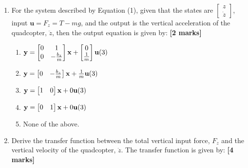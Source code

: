 \documentclass{article}
\begin{document}
\begin{enumerate}
    \vspace{0.5cm}

    \item For the system described by Equation (1), given that the states are $\begin{bmatrix} z \\ \dot{z} \end{bmatrix}$, input $\mathbf{u} = F_z = T - mg$, and the output is the vertical acceleration of the quadcopter, $\ddot{z}$, then the output equation is given by: \hfill \textbf{[2 marks]}
    
    \begin{enumerate}[label=\alph*.]
        \item $\mathbf{y} = \begin{bmatrix} 0 & 1 \\ 0 & -\frac{b_z}{m} \end{bmatrix} \mathbf{x} + \begin{bmatrix} 0 \\ \frac{1}{m} \end{bmatrix} \mathbf{u} \hfill (3)$
        \vspace{2mm}

        \item $\mathbf{y} = \begin{bmatrix} 0 & -\frac{b_z}{m} \end{bmatrix} \mathbf{x} + \frac{1}{m} \mathbf{u} \hfill (3)$
        \vspace{2mm}

        \item $\mathbf{y} = \begin{bmatrix} 1 & 0 \end{bmatrix} \mathbf{x} + 0\mathbf{u} \hfill (3)$
        \vspace{2mm}

        \item $\mathbf{y} = \begin{bmatrix} 0 & 1 \end{bmatrix} \mathbf{x} + 0\mathbf{u} \hfill (3)$
        \vspace{2mm}

        \item None of the above.
    \end{enumerate}

    \item Derive the transfer function between the total vertical input force, $F_z$ and the vertical velocity of the quadcopter, $\dot{z}$. The transfer function is given by: \hfill \textbf{[4 marks]}
    

\end{enumerate}
\end{document}
